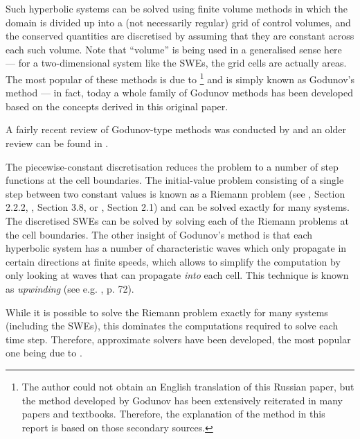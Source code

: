 Such hyperbolic systems can be solved using finite volume methods in which the domain is divided up into a (not necessarily regular) grid of control volumes, and the conserved quantities are discretised by assuming that they are constant across each such volume. Note that ``volume'' is being used in a generalised sense here --- for a two-dimensional system like the SWEs, the grid cells are actually areas. The most popular of these methods is due to \citet{godunov1959difference}\footnote{The author could not obtain an English translation of this Russian paper, but the method developed by Godunov has been extensively reiterated in many papers and textbooks. Therefore, the explanation of the method in this report is based on those secondary sources.} and is simply known as Godunov's method --- in fact, today a whole family of Godunov methods has been developed based on the concepts derived in this original paper.

A fairly recent review of Godunov-type methods was conducted by \citet{toro2007godunov} and an older review can be found in \cite{sweby2001godunov}.

The piecewise-constant discretisation reduces the problem to a number of step functions at the cell boundaries. The initial-value problem consisting of a single step between two constant values is known as a Riemann problem (see \cite{toro1999riemann}, Section 2.2.2, \cite{leveque2002finite}, Section 3.8, or \cite{toro2007godunov}, Section 2.1) and can be solved exactly for many systems. The discretised SWEs can be solved by solving each of the Riemann problems at the cell boundaries. The other insight of Godunov's method is that each hyperbolic system has a number of characteristic waves which only propagate in certain directions at finite speeds, which allows to simplify the computation by only looking at waves that can propagate \emph{into} each cell. This technique is known as \emph{upwinding} (see e.g. \cite{leveque2002finite}, p. 72).

While it is possible to solve the Riemann problem exactly for many systems (including the SWEs), this dominates the computations required to solve each time step. Therefore, approximate solvers have been developed, the most popular one being due to \citet{roe1981approximate}.

